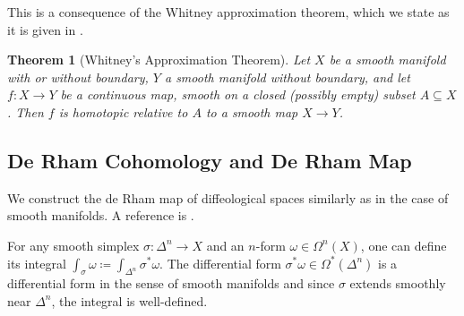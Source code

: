 \documentclass{scrartcl}
\theoremstyle{plain}
\newtheorem{theorem}{Theorem}[section]
\newtheorem{corollary}[theorem]{Corollary}
\theoremstyle{definition}
\renewcommand{\subset}{\subseteq}
\newcommand{\defeq}{\coloneqq}
\DeclareMathOperator{\Map}{Map}
\begin{document}
This is a consequence of the Whitney approximation theorem, which we state as it is given in \cite[Theorem 6.26]{lee2003introduction}.

\begin{theorem}[Whitney's Approximation Theorem]
    Let $X$ be a smooth manifold with or without boundary, $Y$ a smooth manifold without boundary, and let $f\colon X\to Y$ be a continuous map, smooth on a closed (possibly empty) subset $A\subset X$. Then $f$ is homotopic relative to $A$ to a smooth map $X\to Y$.
\end{theorem}






\subsection{De Rham Cohomology and De Rham Map} \label{subsec:diffeological-de-rham}

We construct the de Rham map of diffeological spaces similarly as in the case of smooth manifolds. A reference is \cite{gurer2014topologie}. 

For any smooth simplex $\sigma\colon \Delta^n\to X$ and an $n$-form $\omega\in\Omega^n(X)$, one can define its integral $\int_{\sigma}\omega \defeq \int_{\Delta^n}\sigma^*\omega$. The differential form $\sigma^*\omega\in\Omega^*(\Delta^n)$ is a differential form in the sense of smooth manifolds and since $\sigma$ extends smoothly near $\Delta^n$, the integral is well-defined.
\end{document}
